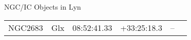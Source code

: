 \begin{block}{NGC/IC Objects in Lyn}
  \centering
  \begin{tabularx}{\textwidth}{llrrll} \toprule 
    NGC2683 & Glx & 08:52:41.33 & +33:25:18.3  & -- \\ 
  \end{tabularx}
\end{block}